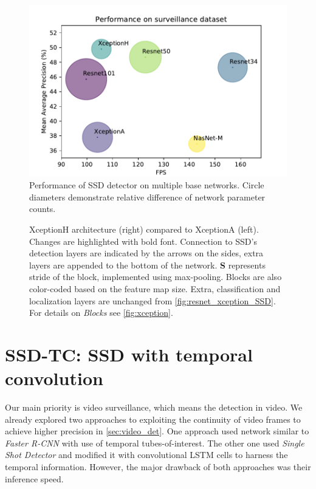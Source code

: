 \begin{figure}
    \centering
    \includegraphics[width=\textwidth]{img/fps_map_s}
    \caption[Performance of SSD with multiple base networks on Surveillance dataset]{Performance of SSD detector on multiple base networks. Circle diameters demonstrate relative difference of network parameter counts.} 
    \label{fig:surv_perf}
\end{figure}

\begin{figure}
    \centering
    \xceptionSSD
    \caption[XceptionH-SSD]%
    {XceptionH architecture (right) compared to XceptionA (left). Changes are highlighted with bold font. Connection to SSD's detection layers are indicated by the arrows on the sides, extra layers are appended to the bottom of the network.  \textbf{S} represents stride of the block, implemented using max-pooling. Blocks are also color-coded based on the feature map size. Extra, classification and localization layers are unchanged from \cref{fig:resnet_xception_SSD}. For details on \textit{Blocks} see \cref{fig:xception}.} 
    \label{fig:xceptionH_SSD}
\end{figure}




\section{SSD-TC: SSD with temporal convolution}
Our main priority is video surveillance, which means the detection in video. We already explored two approaches to exploiting the continuity of video frames to achieve higher precision in \cref{sec:video_det}. One approach used network similar to \textit{Faster R-CNN} with use of temporal tubes-of-interest. The other one used \textit{Single Shot Detector} and modified it with convolutional LSTM cells to harness the temporal information. However, the major drawback of both approaches was their inference speed. 


